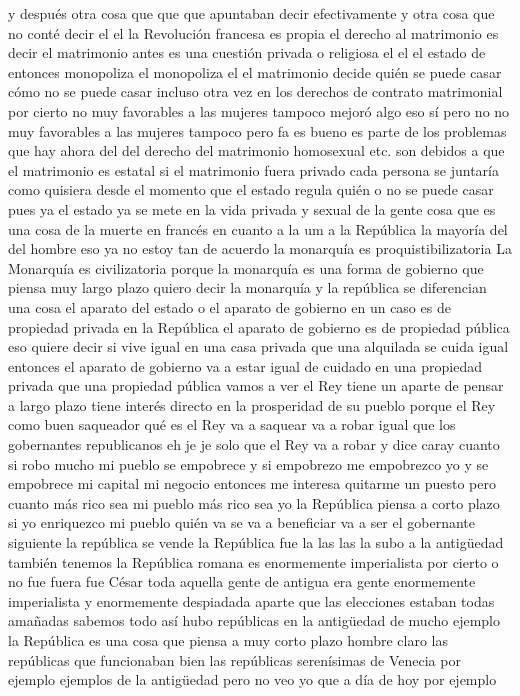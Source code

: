 y después otra cosa que que que apuntaban decir efectivamente y otra cosa que no conté decir el
el la Revolución francesa es propia el derecho al matrimonio es decir el matrimonio antes es una cuestión privada o religiosa
el el el estado de entonces monopoliza el monopoliza el
el matrimonio decide quién se puede casar cómo no se puede casar incluso otra vez en los derechos de contrato matrimonial por cierto no muy favorables a las mujeres
tampoco mejoró algo eso sí pero no no muy favorables a las mujeres tampoco pero fa es bueno
es parte de los problemas que hay ahora del del derecho del matrimonio homosexual etc. son debidos a que el matrimonio es estatal
si el matrimonio fuera privado cada persona se juntaría como quisiera desde el momento que el estado regula quién o no se puede casar pues ya el estado
ya se mete en la vida privada y sexual de la gente cosa que es una cosa de la muerte en francés en cuanto a la um
a la República la mayoría del del hombre eso ya no estoy tan de acuerdo la monarquía es proquistibilizatoria
La Monarquía es civilizatoria
porque la monarquía es una forma de gobierno que piensa muy largo plazo quiero decir la monarquía y la república se diferencian
una cosa el aparato del estado o el aparato de gobierno en un caso es de propiedad privada en la República
el aparato de gobierno es de propiedad pública eso quiere decir
si vive igual en una casa privada que una alquilada se cuida igual
entonces el aparato de gobierno va a estar igual de cuidado en una propiedad privada que una propiedad pública
vamos a ver el Rey tiene un aparte de pensar a largo plazo tiene interés directo en la prosperidad de su pueblo
porque el Rey como buen saqueador qué es el Rey va a saquear va a robar
igual que los gobernantes republicanos eh je je solo que el Rey va a robar y dice caray cuanto
si robo mucho mi pueblo se empobrece y si empobrezo me empobrezco yo y se empobrece
mi capital mi negocio entonces me interesa quitarme un puesto pero cuanto más rico sea mi pueblo más rico sea yo
la República piensa a corto plazo si yo enriquezco mi pueblo quién va se va a beneficiar va a ser el gobernante siguiente
la república se vende la República fue la las las la subo a la antigüedad también tenemos la República romana
es enormemente imperialista por cierto o no fue fuera fue César
toda aquella gente de antigua era gente enormemente imperialista y enormemente despiadada aparte que las elecciones estaban todas amañadas
sabemos todo así hubo repúblicas en la antigüedad de mucho ejemplo la República es una cosa que piensa a muy corto plazo
hombre claro las repúblicas que funcionaban bien las repúblicas serenísimas de Venecia por ejemplo ejemplos de la antigüedad pero no veo yo que a día de hoy por ejemplo

